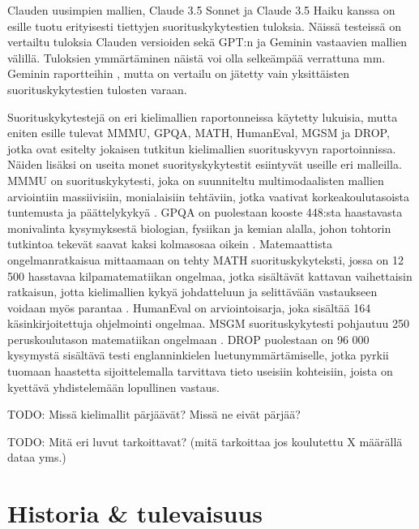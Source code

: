 Clauden uusimpien mallien, Claude 3.5 Sonnet ja Claude 3.5 Haiku kanssa on
esille tuotu erityisesti tiettyjen suorituskykytestien tuloksia. Näissä
testeissä on vertailtu tuloksia Clauden versioiden sekä GPT:n ja Geminin
vastaavien mallien välillä. \parencite{anthropicClaudeSonnetAndHaiku35}
\parencite{anthropicClaudeSonnet} \parencite{anthropicClaudeHaiku} Tuloksien
ymmärtäminen näistä voi olla selkeämpää verrattuna mm. Geminin raportteihin
\parencite{googleDeepmindGeminiv1report}
\parencite{googleDeepmindGeminiv1_5report}, mutta on vertailu on jätetty vain
yksittäisten suorituskykytestien tulosten varaan.

Suorituskykytestejä on eri kielimallien raportonneissa
\parencite{anthropicClaudeSonnetAndHaiku35} \parencite{openAI2023GPT4}
\parencite{openAIGPT4o} \parencite{googleDeepmindGeminiv1_5report} käytetty
lukuisia, mutta eniten esille tulevat MMMU, GPQA, MATH, HumanEval, MGSM ja
DROP, jotka ovat esitelty jokaisen tutkitun kielimallien suorituskyvyn
raportoinnissa. Näiden lisäksi on useita monet suorityskykytestit esiintyvät
useille eri malleilla. MMMU on suorituskykytesti, joka on suunniteltu
multimodaalisten mallien arviointiin massiivisiin, monialaisiin tehtäviin,
jotka vaativat korkeakoulutasoista tuntemusta ja päättelykykyä
\parencite{benchmarkMMMU}. GPQA on puolestaan kooste 448:sta haastavasta
monivalinta kysymyksestä biologian, fysiikan ja kemian alalla, johon tohtorin
tutkintoa tekevät saavat kaksi kolmasosaa oikein \parencite{benchmarkGPQA}.
Matemaattista ongelmanratkaisua mittaamaan on tehty MATH suorituskykyteksti,
jossa on 12 500 hasstavaa kilpamatematiikan ongelmaa, jotka sisältävät
kattavan vaihettaisin ratkaisun, jotta kielimallien kykyä johdatteluun ja
selittävään vastaukseen voidaan myös parantaa \parencite{benchmarkMATH}.
HumanEval \parencite{benchmarkHumanEval} on arviointoisarja, joka sisältää
164 käsinkirjoitettuja ohjelmointi ongelmaa. MSGM suorituskykytesti
pohjautuu 250 peruskoulutason matematiikan ongelmaan \parencite{benchmarkMSGM}.
DROP puolestaan on 96 000 kysymystä sisältävä testi englanninkielen
luetunymmärtämiselle, jotka pyrkii tuomaan haastetta sijoittelemalla
tarvittava tieto useisiin kohteisiin, joista on kyettävä yhdistelemään
lopullinen vastaus.

TODO: Missä kielimallit pärjäävät? Missä ne eivät pärjää?

TODO: Mitä eri luvut tarkoittavat? (mitä tarkoittaa jos koulutettu X määrällä dataa yms.)

\section{Historia \& tulevaisuus}

